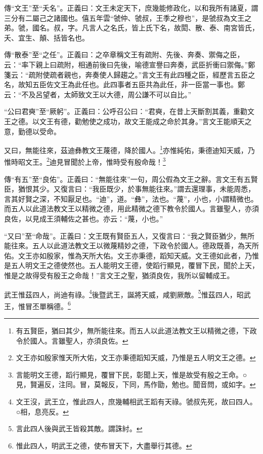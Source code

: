{\noindent\zhuan{}\fzbyks 傳“文王”至“夭名”。正義曰：文王未定天下，庶幾能修政化，以和我所有諸夏，謂三分有二屬己之諸國也。僖五年雲“虢仲、虢叔，王季之穆也”，是虢叔為文王之弟。虢，國名。叔，字。凡言人之名氏，皆上氏下名，故閎、散、泰、南宮皆氏，夭、宜生、顛、括皆名也。 \par}

{\noindent\zhuan{}\fzbyks 傳“散泰”至“之任”。正義曰：之卒章稱文王有疏附、先後、奔奏、禦侮之臣，云：“率下親上曰疏附，相通前後曰先後，喻德宣譽曰奔奏，武臣折衝曰禦侮。”鄭箋云：“疏附使疏者親也，奔奏使人歸趨之。”言文王有此四種之臣，經歷言五臣之名，故知五臣佐文王為此任也。此四事者五臣共為此任，非一臣當一事也。鄭云：“不及呂望者，太師致文王以大德，周公謙不可以自比。” \par}

{\noindent\shu{}\fzkt “公曰君奭”至“厥躬”。正義曰：公呼召公曰：“君奭，在昔上天斷割其義，重勸文王之德。以文王有德，勸勉使之成功，故文王能成之命於其身。”言文王能順天之意，勤德以受命。 \par}

又曰，無能往來，茲迪彝教文王蔑德，降於國人。\footnote{有五賢臣，猶曰其少，無所能往來。而五人以此道法教文王以精微之德，下政令於國人。言雖聖人，亦須良佐。}亦惟純佑，秉德迪知天威，乃惟時昭文王。\footnote{文王亦如殷家惟天所大佑，文王亦秉德蹈知天威，乃惟是五人明文王之德。}迪見冒聞於上帝，惟時受有殷命哉！\footnote{言能明文王德，蹈行顯見，覆冒下民，彰聞上天，惟是故受有殷之王命。○見，賢遍反，注同。冒，莫報反，下同，馬作勖，勉也。聞音問，或如字。}


{\noindent\zhuan{}\fzbyks 傳“有五”至“良佑”。正義曰：“無能往來”一句，周公假為文王之辭。言文王有五賢臣，猶恨其少。又復言曰：“我臣既少，於事無能往來。”謂去還理事，未能周悉，言其好賢之深，不知厭足也。“迪”，道。“彝”，法也。“蔑”，小也，小謂精微也。而五人以此道法教文王以精微之德，用此精微之德下教令於國人。言雖聖人，亦須良佐，以見成王須輔佐之甚也。亦云：“蔑，小也。” \par}

{\noindent\shu{}\fzkt “又曰”至“命哉”。正義曰：文王既有賢臣五人，又復言曰：“我之賢臣猶少，無所能往來。五人以此道法教文王以微蔑精妙之德，下政令於國人。德政既善，為天所佑。文王亦如殷家，惟為天所大佑。文王亦秉德，蹈知天威。文王德如此者，乃惟是五人明文王之德使然也。五人能明文王德，使蹈行顯見，覆冒下民，聞於上天，惟是之故得受有殷王之命哉！”言文王之聖，猶須良佐，我所以留輔成王。 \par}

武王惟茲四人，尚迪有祿。\footnote{文王沒，武王立，惟此四人，庶幾輔相武王蹈有天祿。虢叔先死，故曰四人。○相，息亮反。}後暨武王，誕將天威，咸劉厥敵。\footnote{言此四人後與武王皆殺其敵。謂誅紂。}惟茲四人，昭武王，惟冒丕單稱德。\footnote{惟此四人，明武王之德，使布冒天下，大盡舉行其德。}


